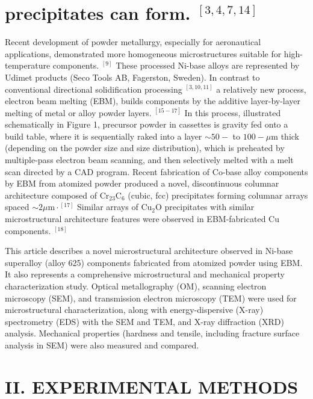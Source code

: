 \documentclass[10pt]{article}
\begin{document}
\section*{precipitates can form. ${ }^{[3,4,7,14]}$}
Recent development of powder metallurgy, especially for aeronautical applications, demonstrated more homogeneous microstructures suitable for high-temperature components. ${ }^{[9]}$ These processed Ni-base alloys are represented by Udimet products (Seco Tools AB, Fagerston, Sweden). In contrast to conventional directional solidification processing ${ }^{[3,10,11]}$ a relatively new process, electron beam melting (EBM), builds components by the additive layer-by-layer melting of metal or alloy powder layers. ${ }^{[15-17]}$ In this process, illustrated schematically in Figure 1, precursor powder in cassettes is gravity fed onto a build table, where it is sequentially raked into a layer $\sim 50-$ to $100-\mu \mathrm{m}$ thick (depending on the powder size and size distribution), which is preheated by multiple-pass electron beam scanning, and then selectively melted with a melt scan directed by a CAD program. Recent fabrication of Co-base alloy components by EBM from atomized powder produced a novel, discontinuous columnar architecture composed of $\mathrm{Cr}_{23} \mathrm{C}_{6}$ (cubic, fcc) precipitates forming columnar arrays spaced $\sim 2 \mu \mathrm{m} \cdot{ }^{[17]}$ Similar arrays of $\mathrm{Cu}_{2} \mathrm{O}$ precipitates with similar microstructural architecture features were observed in EBM-fabricated Cu components. ${ }^{[18]}$

This article describes a novel microstructural architecture observed in Ni-base superalloy (alloy 625) components fabricated from atomized powder using EBM. It also represents a comprehensive microstructural and mechanical property characterization study. Optical metallography (OM), scanning electron microscopy (SEM), and transmission electron microscopy (TEM) were used for microstructural characterization, along with energy-dispersive (X-ray) spectrometry (EDS) with the SEM and TEM, and X-ray diffraction (XRD) analysis. Mechanical properties (hardness and tensile, including fracture surface analysis in SEM) were also measured and compared.

\section*{II. EXPERIMENTAL METHODS}
\end{document}
